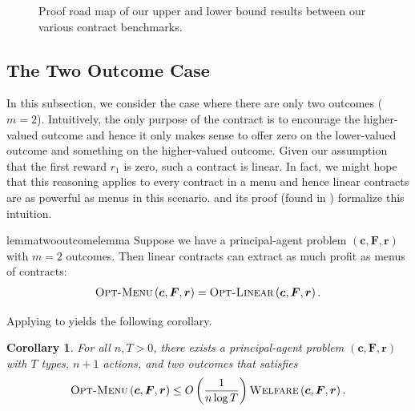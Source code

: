 \documentclass{article}
\newtheorem{corollary}[theorem]{Corollary}
\newcommand{\costvector}{\bm{c}}
\newcommand{\ForecastTensor}{\bm{F}}
\newcommand{\reward}[1]{r_{#1}}
\newcommand{\rewardvector}{\bm{r}}
\newcommand{\PrincipalAgentProblem}{\left(\costvector, \ForecastTensor, \rewardvector\right)}
\newcommand{\OWelfare}{\textsc{Welfare}}
\newcommand{\OMenu}{\textsc{Opt-Menu}}
\newcommand{\OLinear}{\textsc{Opt-Linear}}
\begin{document}
\begin{figure}[h]
\caption{Proof road map of our upper and lower bound results between our various contract benchmarks.}
\label{fig:roadmap}
\end{figure}%

\subsection{The Two Outcome Case}
\label{subsec:two-outcome}

In this subsection, we consider the case where there are only two outcomes ($m = 2$). Intuitively, the only purpose of the contract is to encourage the higher-valued outcome and hence it only makes sense to offer zero on the lower-valued outcome and something on the higher-valued outcome. Given our assumption that the first reward $\reward{1}$ is zero, such a contract is linear. In fact, we might hope that this reasoning applies to every contract in a menu and hence linear contracts are as powerful as menus in this scenario.  and its proof (found in ) formalize this intuition.

\begin{restatable}{lemma}{twooutcomelemma}
\label{lem:two-outcome-linear}
  Suppose we have a principal-agent problem $\PrincipalAgentProblem$ with $m = 2$ outcomes. Then linear contracts can extract as much profit as menus of contracts:
  \begin{align*}
    \OMenu \PrincipalAgentProblem = \OLinear \PrincipalAgentProblem\text{.}
  \end{align*}
\end{restatable}

Applying  to  yields the following corollary.

\begin{corollary}
\label{cor:two-outcome-linear}
For all $n, T > 0$, there exists a principal-agent problem $\PrincipalAgentProblem$ with $T$ types, $n+1$ actions, and two outcomes that satisfies
\begin{align*}
  \OMenu \PrincipalAgentProblem \le O\left( \frac{1}{n \log T} \right) \OWelfare \PrincipalAgentProblem
  \text{.}
\end{align*}
\end{corollary}
\end{document}
